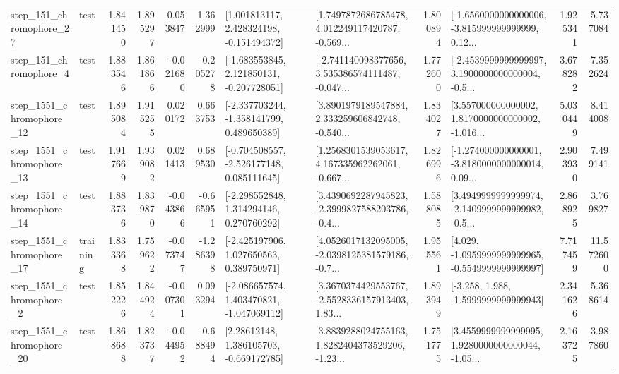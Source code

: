 \begin{tabular}{llrrrrllrlrr}
  step\_151\_chromophore\_27 &      test &      1.841450 &    1.895297 &      0.053847 &  1.362999 &    [1.001813117, 2.428324198, -0.151494372] &  [1.7497872686785478, 4.012249117420787, -0.569... &       1.800894 &  [-1.6560000000000006, -3.815999999999999, 0.12... &            1.925341 &          5.737084 \\
   step\_151\_chromophore\_4 &      test &      1.883546 &    1.861866 &     -0.021680 & -0.205278 &   [-1.683553845, 2.121850131, -0.207728051] &  [-2.741140098377656, 3.535386574111487, -0.047... &       1.772600 &  [-2.4539999999999997, 3.1900000000000004, -0.5... &            3.678282 &          7.352624 \\
 step\_1551\_chromophore\_12 &      test &      1.895084 &    1.915255 &      0.020172 &  0.663753 &   [-2.337703244, -1.358141799, 0.489650389] &  [3.8901979189547884, 2.333259606842748, -0.540... &       1.834027 &  [3.557000000000002, 1.8170000000000002, -1.016... &            5.030449 &          8.414008 \\
 step\_1551\_chromophore\_13 &      test &      1.917669 &    1.939082 &      0.021413 &  0.689530 &   [-0.704508557, -2.526177148, 0.085111645] &  [1.2568301539053617, 4.167335962262061, -0.667... &       1.826996 &  [-1.274000000000001, -3.8180000000000014, 0.09... &            2.903930 &          7.499141 \\
 step\_1551\_chromophore\_14 &      test &      1.883736 &    1.839870 &     -0.043866 & -0.665951 &    [-2.298552848, 1.314294146, 0.270760292] &  [3.4390692287945823, -2.3999827588203786, -0.4... &       1.588085 &  [3.4949999999999974, -2.1409999999999982, -0.5... &            2.868925 &          3.769827 \\
 step\_1551\_chromophore\_17 &  training &      1.833368 &    1.759622 &     -0.073747 & -1.286398 &    [-2.425197906, 1.027650563, 0.389750971] &  [4.0526017132095005, -2.0398125381579186, -0.7... &       1.955561 &  [4.029, -1.0959999999999965, -0.5549999999999997] &            7.717459 &         11.572600 \\
  step\_1551\_chromophore\_2 &      test &      1.852226 &    1.844924 &     -0.007301 &  0.093294 &   [-2.086657574, 1.403470821, -1.047069112] &  [3.3670374429553767, -2.5528336157913403, 1.83... &       1.893949 &               [-3.258, 1.988, -1.5999999999999943] &            2.341626 &          5.368614 \\
 step\_1551\_chromophore\_20 &      test &      1.868688 &    1.823737 &     -0.044952 & -0.688494 &     [2.28612148, 1.386105703, -0.669172785] &  [3.8839288024755163, 1.8282404373529206, -1.23... &       1.751775 &  [3.4559999999999995, 1.9280000000000044, -1.05... &            2.163725 &          3.987860 \\

\end{tabular}
